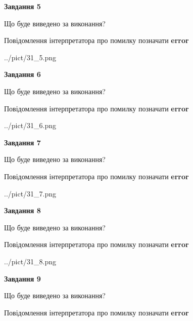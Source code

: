 \documentclass[11pt, ukrainian]{article}
\begin{document}
{\begin {large}
{\begin {center}\textbf{Завдання 5}\end {center}}\par
Що буде виведено за виконання? \par
Повідомлення інтерпретатора про помилку позначати \textbf{error}

\begin{center}
	{../pict/31_5.png}
\end{center}
\newpage

{\begin {center}\textbf{Завдання 6}\end {center}}\par
Що буде виведено за виконання? \par
Повідомлення інтерпретатора про помилку позначати \textbf{error}

\begin{center}
	{../pict/31_6.png}
\end{center}
\newpage

{\begin {center}\textbf{Завдання 7}\end {center}}\par
Що буде виведено за виконання? \par
Повідомлення інтерпретатора про помилку позначати \textbf{error}

\begin{center}
	{../pict/31_7.png}
\end{center}
\newpage

{\begin {center}\textbf{Завдання 8}\end {center}}\par
Що буде виведено за виконання? \par
Повідомлення інтерпретатора про помилку позначати \textbf{error}

\begin{center}
	{../pict/31_8.png}
\end{center}
\newpage

{\begin {center}\textbf{Завдання 9}\end {center}}\par
Що буде виведено за виконання? \par
Повідомлення інтерпретатора про помилку позначати \textbf{error}


\end{large}}
\end{document}
